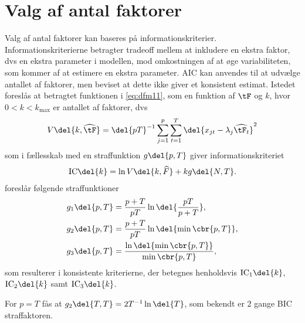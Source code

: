 \section{Valg af antal faktorer}
%
Valg af antal faktorer kan baseres på informationskriterier.
Informationskriterierne betragter tradeoff mellem at inkludere en ekstra faktor, dvs en ekstra parameter i modellen, mod omkostningen af at øge variabiliteten, som kommer af at estimere en ekstra parameter.
AIC kan anvendes til at udvælge antallet af faktorer, men \citep{Bai_Ng} beviset at dette ikke giver et konsistent estimat.
Istedet foreslås at betragtet funktionen i \eqref{eq:dfm11}, som en funktion af \(\tF\) og \(k\), hvor \(0<k<k_\text{max}\) er antallet af faktorer, dvs
\begin{align*}
V \del{k, \widehat{\tF}} = \del{pT}^{-1} \sum_{j=1}^p \sum_{t=1}^T \del{x_{jt} -\lambda_j \widehat{\tF_t}}^2
\end{align*}
som i fællesskab med en straffunktion \(g \del{p,T}\) giver informationskriteriet
\begin{align*}
\text{IC} \del{k} = \ln V \del{k, \widehat{F}} + k g \del{N,T}.
\end{align*}
\citep{Bai_Ng} foreslår følgende straffunktioner
\begin{align*}
g_1 \del{p,T} &= \frac{p + T}{p T} \ln \del{\frac{pT}{p + T}}, \\
g_2 \del{p,T} &= \frac{p + T}{p T} \ln \del{ \min \cbr{p, T}}, \\
g_3 \del{p,T} &= \frac{\ln \del{\min \cbr{p, T}}}{\min \cbr{p, T}},
\end{align*}
som resulterer i konsistente kriterierne, der betegnes henholdsvis \(\text{IC}_1 \del{k}\), \(\text{IC}_2 \del{k}\) samt \(\text{IC}_3 \del{k}\).

For \(p = T\) fås at \(g_2 \del{T,T} = 2T^{-1} \ln \del{T}\), som bekendt er \(2\) gange BIC straffaktoren.

